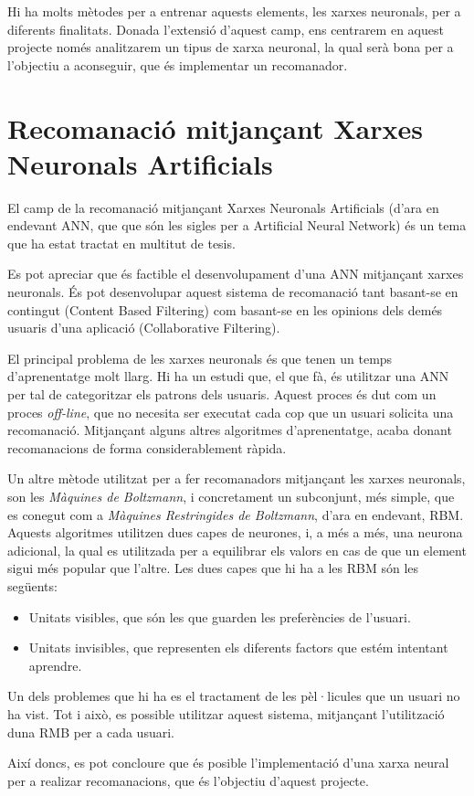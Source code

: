 Hi ha molts mètodes per a entrenar aquests elements, les xarxes neuronals, per a diferents finalitats. Donada l'extensió d'aquest camp, ens centrarem en aquest projecte només analitzarem un tipus de xarxa neuronal, la qual serà bona per a l'objectiu a aconseguir, que és implementar un recomanador.

\section{Recomanació mitjançant Xarxes Neuronals Artificials}
\label{sec:estat-de-lart-ann}

El camp de la recomanació mitjançant Xarxes Neuronals Artificials (d'ara en endevant ANN, que que són les sigles per a Artificial Neural Network) és un tema que ha estat tractat en multitut de tesis.

Es pot apreciar que és factible el desenvolupament d'una ANN mitjançant xarxes neuronals. És pot desenvolupar aquest sistema de recomanació tant basant-se en contingut (Content Based Filtering) com basant-se en les opinions dels demés usuaris d'una aplicació (Collaborative Filtering).

El principal problema de les xarxes neuronals és que tenen un temps d'aprenentatge molt llarg\cite{faster-ann-recomender}. Hi ha un estudi\cite{collaborative-filtering-som-cbr} que, el que fà, és utilitzar una ANN per tal de categoritzar els patrons dels usuaris. Aquest proces és dut com un proces \emph{off-line}, que no necesita ser executat cada cop que un usuari solicita una recomanació. Mitjançant alguns altres algoritmes d'aprenentatge, acaba donant recomanacions de forma considerablement ràpida.

Un altre mètode utilitzat per a fer recomanadors mitjançant les xarxes neuronals, son les \emph{Màquines de Boltzmann}, i concretament un subconjunt, més simple, que es conegut com a \emph{Màquines Restringides de Boltzmann}, d'ara en endevant, RBM. Aquests algoritmes utilitzen dues capes de neurones, i, a més a més, una neurona adicional, la qual es utilitzada per a equilibrar els valors en cas de que un element sigui més popular que l'altre. Les dues capes que hi ha a les RBM són les següents\cite{introduction-rbm}:

\begin{itemize}
	\item Unitats visibles, que són les que guarden les preferències de l'usuari.
	\item Unitats invisibles, que representen els diferents factors que estém intentant aprendre.
\end{itemize}

Un dels problemes que hi ha es el tractament de les pèl·licules que un usuari no ha vist. Tot i això, es possible utilitzar aquest sistema, mitjançant l'utilització duna RMB per a cada usuari\cite{rmb-collaborative-filtering}.

Així doncs, es pot concloure que és posible l'implementació d'una xarxa neural per a realizar recomanacions, que és l'objectiu d'aquest projecte.